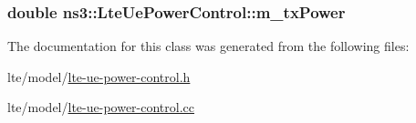 \subsubsection[{\texorpdfstring{m\+\_\+tx\+Power}{m_txPower}}]{\setlength{\rightskip}{0pt plus 5cm}double ns3\+::\+Lte\+Ue\+Power\+Control\+::m\+\_\+tx\+Power\hspace{0.3cm}{\ttfamily [private]}}\hypertarget{classns3_1_1LteUePowerControl_a36f256a1ffe0a21f448b58727d0d5bb4}{}\label{classns3_1_1LteUePowerControl_a36f256a1ffe0a21f448b58727d0d5bb4}


The documentation for this class was generated from the following files\+:\begin{DoxyCompactItemize}
\item 
lte/model/\hyperlink{lte-ue-power-control_8h}{lte-\/ue-\/power-\/control.\+h}\item 
lte/model/\hyperlink{lte-ue-power-control_8cc}{lte-\/ue-\/power-\/control.\+cc}\end{DoxyCompactItemize}
